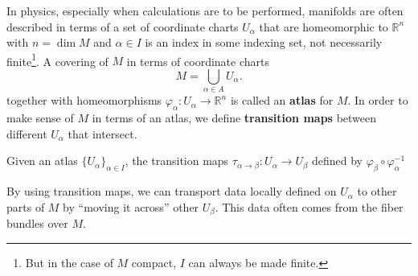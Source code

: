 	
	In physics, especially when calculations are to be performed, manifolds are often described in terms of a set of coordinate charts $U_\alpha$ that are homeomorphic to $\mathbb R^n$ with $n = \dim M$ and $\alpha \in I$ is an index in some indexing set, not necessarily finite\footnote{But in the case of $M$ compact, $I$ can always be made finite.}. A covering of $M$ in terms of coordinate charts 
	\[
		M = \bigcup_{\alpha \in A} U_\alpha.
	\]
	together with homeomorphisms $\varphi_\alpha: U_\alpha \to \mathbb R^n$ is called an \textbf{atlas} for $M$. In order to make sense of $M$ in terms of an atlas, we define \textbf{transition maps} between different $U_\alpha$ that intersect.
	\begin{defn}
		Given an atlas $\{U_{\alpha}\}_{\alpha \in I}$, the transition maps $\tau_{\alpha \to \beta}: U_\alpha \to U_\beta$ defined by $\varphi_\beta \circ \varphi_{\alpha}^{-1}$
	\end{defn} 
	By using transition maps, we can transport data locally defined on $U_{\alpha}$ to other parts of $M$ by ``moving it across'' other $U_\beta$. This data often comes from the fiber bundles over $M$.
	
